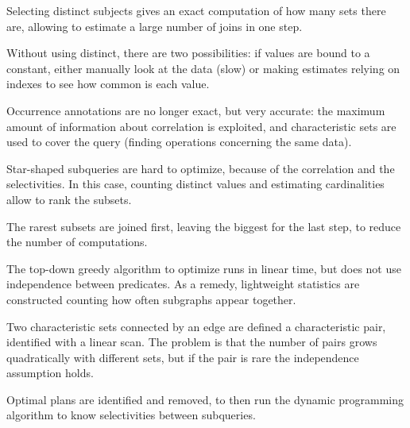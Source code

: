Selecting distinct subjects gives an exact computation of how many sets there are, allowing to estimate a large number of joins in one step.

Without using distinct, there are two possibilities: if values are bound to a constant, either manually look at the data (slow) or making estimates relying on indexes to see how common is each value.

Occurrence annotations are no longer exact, but very accurate: the maximum amount of information about correlation is exploited, and characteristic sets are used to cover the query (finding operations concerning the same data).

Star-shaped subqueries are hard to optimize, because of the correlation and the selectivities. In this case, counting distinct values and estimating cardinalities allow to rank the subsets.

The rarest subsets are joined first, leaving the biggest for the last step, to reduce the number of computations.

The top-down greedy algorithm to optimize runs in linear time, but does not use independence between predicates. As a remedy, lightweight statistics are constructed counting how often subgraphs appear together. 

Two characteristic sets connected by an edge are defined a characteristic pair, identified with a linear scan. The problem is that the number of pairs grows quadratically with different sets, but if the pair is rare the independence assumption holds.

Optimal plans are identified and removed, to then run the dynamic programming algorithm to know selectivities between subqueries.


